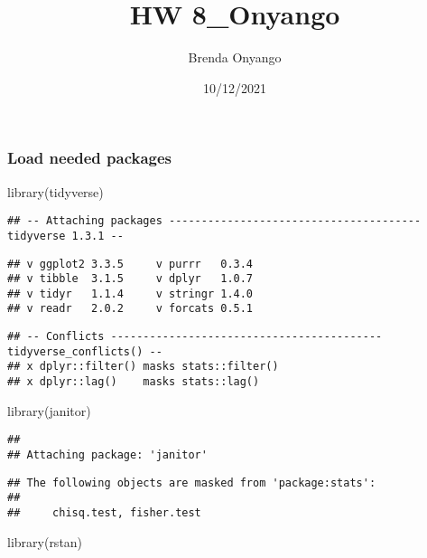\documentclass[
]{article}
\title{HW 8\_Onyango}
\author{Brenda Onyango}
\date{10/12/2021}
\newenvironment{Shaded}{\begin{snugshade}}{\end{snugshade}}
\newcommand{\FunctionTok}[1]{\textcolor[rgb]{0.00,0.00,0.00}{#1}}
\newcommand{\NormalTok}[1]{#1}
\begin{document}
\maketitle

\hypertarget{load-needed-packages}{%
\subsubsection{Load needed packages}\label{load-needed-packages}}

\begin{Shaded}
\begin{Highlighting}[]
\FunctionTok{library}\NormalTok{(tidyverse)}
\end{Highlighting}
\end{Shaded}

\begin{verbatim}
## -- Attaching packages --------------------------------------- tidyverse 1.3.1 --
\end{verbatim}

\begin{verbatim}
## v ggplot2 3.3.5     v purrr   0.3.4
## v tibble  3.1.5     v dplyr   1.0.7
## v tidyr   1.1.4     v stringr 1.4.0
## v readr   2.0.2     v forcats 0.5.1
\end{verbatim}

\begin{verbatim}
## -- Conflicts ------------------------------------------ tidyverse_conflicts() --
## x dplyr::filter() masks stats::filter()
## x dplyr::lag()    masks stats::lag()
\end{verbatim}

\begin{Shaded}
\begin{Highlighting}[]
\FunctionTok{library}\NormalTok{(janitor)}
\end{Highlighting}
\end{Shaded}

\begin{verbatim}
## 
## Attaching package: 'janitor'
\end{verbatim}

\begin{verbatim}
## The following objects are masked from 'package:stats':
## 
##     chisq.test, fisher.test
\end{verbatim}

\begin{Shaded}
\begin{Highlighting}[]
\FunctionTok{library}\NormalTok{(rstan)}
\end{Highlighting}
\end{Shaded}
\end{document}
